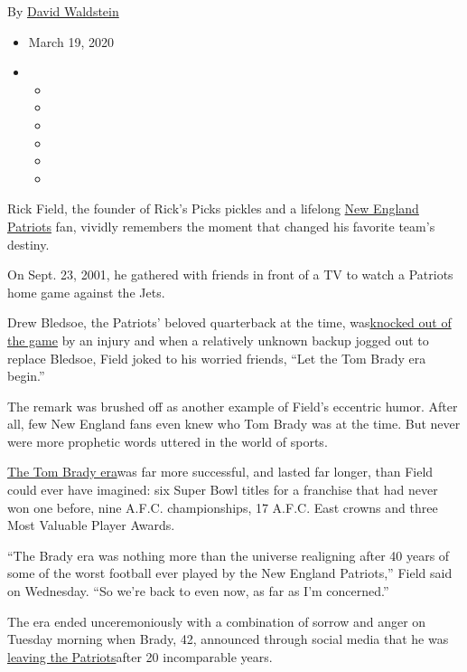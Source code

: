 By \href{https://www.nytimes3xbfgragh.onion/by/david-waldstein}{David
Waldstein}

\begin{itemize}
\item
  March 19, 2020
\item
  \begin{itemize}
  \item
  \item
  \item
  \item
  \item
  \item
  \end{itemize}
\end{itemize}

Rick Field, the founder of Rick's Picks pickles and a lifelong
\href{https://www.nytimes3xbfgragh.onion/2020/04/22/sports/football/patriots-nfl-draft-bill-belichick.html}{New
England Patriots} fan, vividly remembers the moment that changed his
favorite team's destiny.

On Sept. 23, 2001, he gathered with friends in front of a TV to watch a
Patriots home game against the Jets.

Drew Bledsoe, the Patriots' beloved quarterback at the time,
was\href{http://www.nfl.com/videos/nfl-films-presents/09000d5d8227f09b/Bledsoe-to-Brady-The-hit-that-changed-history}{knocked
out of the game} by an injury and when a relatively unknown backup
jogged out to replace Bledsoe, Field joked to his worried friends, ``Let
the Tom Brady era begin.''

The remark was brushed off as another example of Field's eccentric
humor. After all, few New England fans even knew who Tom Brady was at
the time. But never were more prophetic words uttered in the world of
sports.

\href{https://www.nytimes3xbfgragh.onion/2020/03/17/sports/football/tom-brady-2007-season.html}{The
Tom Brady era}was far more successful, and lasted far longer, than Field
could ever have imagined: six Super Bowl titles for a franchise that had
never won one before, nine A.F.C. championships, 17 A.F.C. East crowns
and three Most Valuable Player Awards.

``The Brady era was nothing more than the universe realigning after 40
years of some of the worst football ever played by the New England
Patriots,'' Field said on Wednesday. ``So we're back to even now, as far
as I'm concerned.''

The era ended unceremoniously with a combination of sorrow and anger on
Tuesday morning when Brady, 42, announced through social media that he
was
\href{https://www.nytimes3xbfgragh.onion/2020/03/17/sports/football/tom-brady-patriots.html}{leaving
the Patriots}after 20 incomparable years.

